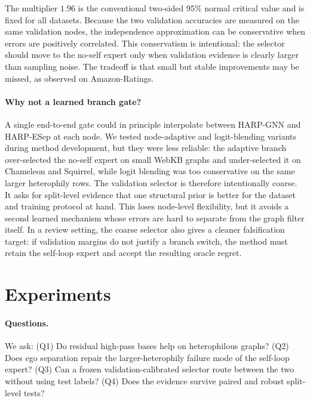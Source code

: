 \documentclass[letterpaper]{article} %
\newcommand{\base}{HARP-GNN}
\newcommand{\esep}{HARP-ESep}
\begin{document}
The multiplier $1.96$ is the conventional two-sided 95\% normal critical value and is fixed for all datasets.
Because the two validation accuracies are measured on the same validation nodes, the independence approximation can be conservative when errors are positively correlated.
This conservatism is intentional: the selector should move to the no-self expert only when validation evidence is clearly larger than sampling noise.
The tradeoff is that small but stable improvements may be missed, as observed on Amazon-Ratings.

\paragraph{Why not a learned branch gate?}
A single end-to-end gate could in principle interpolate between \base{} and \esep{} at each node.
We tested node-adaptive and logit-blending variants during method development, but they were less reliable: the adaptive branch over-selected the no-self expert on small WebKB graphs and under-selected it on Chameleon and Squirrel, while logit blending was too conservative on the same larger heterophily rows.
The validation selector is therefore intentionally coarse.
It asks for split-level evidence that one structural prior is better for the dataset and training protocol at hand.
This loses node-level flexibility, but it avoids a second learned mechanism whose errors are hard to separate from the graph filter itself.
In a review setting, the coarse selector also gives a cleaner falsification target: if validation margins do not justify a branch switch, the method must retain the self-loop expert and accept the resulting oracle regret.

\section{Experiments}

\paragraph{Questions.}
We ask:
(Q1) Do residual high-pass bases help on heterophilous graphs?
(Q2) Does ego separation repair the larger-heterophily failure mode of the self-loop expert?
(Q3) Can a frozen validation-calibrated selector route between the two without using test labels?
(Q4) Does the evidence survive paired and robust split-level tests?
\end{document}

